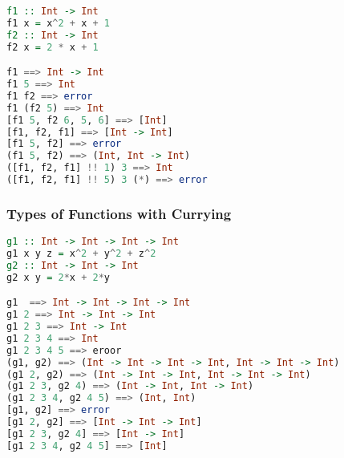 \begin{lstlisting}[language=Haskell]
f1 :: Int -> Int
f1 x = x^2 + x + 1
f2 :: Int -> Int
f2 x = 2 * x + 1

f1 ==> Int -> Int
f1 5 ==> Int
f1 f2 ==> error
f1 (f2 5) ==> Int
[f1 5, f2 6, 5, 6] ==> [Int]
[f1, f2, f1] ==> [Int -> Int]
[f1 5, f2] ==> error
(f1 5, f2) ==> (Int, Int -> Int)
([f1, f2, f1] !! 1) 3 ==> Int
([f1, f2, f1] !! 5) 3 (*) ==> error
\end{lstlisting}

\hypertarget{types-of-functions-with-currying}{%
\subsubsection{Types of Functions with
Currying}\label{types-of-functions-with-currying}}

\begin{lstlisting}[language=Haskell]
g1 :: Int -> Int -> Int -> Int
g1 x y z = x^2 + y^2 + z^2
g2 :: Int -> Int -> Int
g2 x y = 2*x + 2*y

g1  ==> Int -> Int -> Int -> Int
g1 2 ==> Int -> Int -> Int
g1 2 3 ==> Int -> Int
g1 2 3 4 ==> Int
g1 2 3 4 5 ==> eroor
(g1, g2) ==> (Int -> Int -> Int -> Int, Int -> Int -> Int)
(g1 2, g2) ==> (Int -> Int -> Int, Int -> Int -> Int)
(g1 2 3, g2 4) ==> (Int -> Int, Int -> Int)
(g1 2 3 4, g2 4 5) ==> (Int, Int)
[g1, g2] ==> error
[g1 2, g2] ==> [Int -> Int -> Int]
[g1 2 3, g2 4] ==> [Int -> Int]
[g1 2 3 4, g2 4 5] ==> [Int]
\end{lstlisting}
